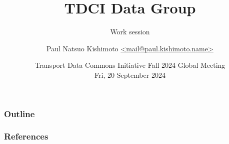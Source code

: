 \documentclass[12pt,aspectratio=169]{beamer}
\title{TDCI Data Group}
\subtitle{Work session}
\date{
  \texorpdfstring{Transport Data Commons Initiative Fall 2024 Global Meeting\\
  Fri, 20 September 2024}%
  {2024-09-20}}
\author{\texorpdfstring{Paul Natsuo Kishimoto\scriptsize\newline
  \href{mailto:mail@paul.kishimoto.name}%
       {\ttfamily <mail@paul.kishimoto.name>}}%
  {Paul Natsuo Kishimoto <mail@paul.kishimoto.name>}}
\begin{document}
\maketitle

\begin{frame}
\frametitle{Outline}

\tableofcontents

\end{frame}

\appendix

\begin{frame}
\frametitle{References}
\printbibliography
\end{frame}
\end{document}
